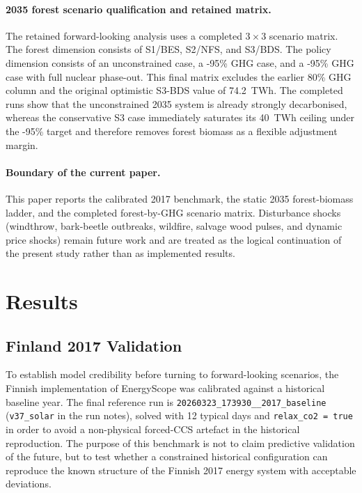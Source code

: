 \documentclass{article}
\begin{document}
\paragraph{2035 forest scenario qualification and retained matrix.}
The retained forward-looking analysis uses a completed $3 \times 3$ scenario matrix. The forest dimension consists of S1/BES, S2/NFS, and S3/BDS. The policy dimension consists of an unconstrained case, a -95\% GHG case, and a -95\% GHG case with full nuclear phase-out. This final matrix excludes the earlier 80\% GHG column and the original optimistic S3-BDS value of 74.2~TWh. The completed runs show that the unconstrained 2035 system is already strongly decarbonised, whereas the conservative S3 case immediately saturates its 40~TWh ceiling under the -95\% target and therefore removes forest biomass as a flexible adjustment margin.

\paragraph{Boundary of the current paper.}
This paper reports the calibrated 2017 benchmark, the static 2035 forest-biomass ladder, and the completed forest-by-GHG scenario matrix. Disturbance shocks (windthrow, bark-beetle outbreaks, wildfire, salvage wood pulses, and dynamic price shocks) remain future work and are treated as the logical continuation of the present study rather than as implemented results.

\section{Results}
\label{sec:results}

\subsection{Finland 2017 Validation}

To establish model credibility before turning to forward-looking scenarios, the Finnish implementation of EnergyScope was calibrated against a historical baseline year. The final reference run is \texttt{20260323\_173930\_\_2017\_baseline} (\texttt{v37\_solar} in the run notes), solved with 12 typical days and \texttt{relax\_co2 = true} in order to avoid a non-physical forced-CCS artefact in the historical reproduction. The purpose of this benchmark is not to claim predictive validation of the future, but to test whether a constrained historical configuration can reproduce the known structure of the Finnish 2017 energy system with acceptable deviations.
\end{document}
